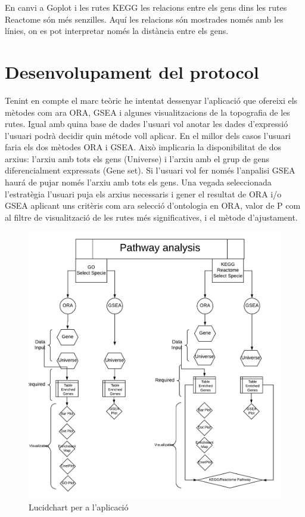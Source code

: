 En canvi a Goplot i les rutes KEGG les relacions entre els gens dins les rutes Reactome són més senzilles. Aquí les relacions són mostrades només amb les línies, on es pot interpretar només la distància entre els gens. 

\section{Desenvolupament del protocol}

Tenint en compte el marc teòric he intentat dessenyar l'aplicació que ofereixi els mètodes com ara ORA, GSEA i algunes visualitzacions de la topografia de les rutes. Igual amb quina base de dades l'usuari vol anotar les dades d'expressió l'usuari podrà decidir quin métode voll aplicar. En el millor dels casos l'usuari faria els dos mètodes ORA i GSEA. Això implicaria la disponibilitat de dos arxius: l'arxiu amb tots els gens (Universe) i l'arxiu amb el grup de gens diferencialment expressats (Gene set). Si l'usuari vol fer només l'anpalisi GSEA haurá de pujar només l'arxiu amb tots els gens. Una vegada seleccionada l'estratègia l'usuari puja els arxius necessaris i gener el resultat de ORA i/o GSEA aplicant uns critèris com ara selecció d'ontologia en ORA, valor de P com al filtre de visualització de les rutes més significatives, i el mètode d'ajustament.

\begin{figure}[H]
\centering
\includegraphics[width=.9\textwidth]{figures/LucidChart} 
\caption{Lucidchart per a l'aplicació}
\end{figure}

